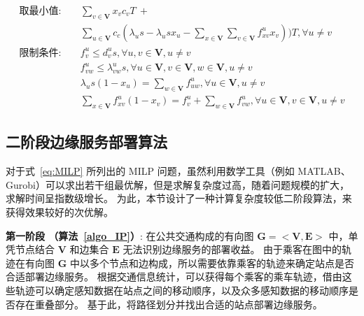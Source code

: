 \begin{equation}
\begin{aligned}
取最小值: &\quad \sum_{v\in \boldsymbol{V}}x_v c_vT \ + \\&\quad \sum_{u\in \boldsymbol{V}}c_c(\lambda_u s -  \lambda_u s x_u - \sum_{x\in \boldsymbol{V}}\sum_{v\in \boldsymbol{V}}f^u_{xv} x_v ))T, \forall u \neq v\\
\text{限制条件:} &\quad  f^u_v \leq d^u_v s, \forall u, v\in \boldsymbol{V}, u\neq v\\
&\quad f^u_{vw} \leq \lambda^u_{vw} s, \forall u \in \boldsymbol{V}, v \in \boldsymbol{V}, w \in \boldsymbol{V}, u \neq v\\
&\quad \lambda_u s (1 - x_u) = \sum_{w\in \boldsymbol{V}}f^u_{uw}, \forall u\in \boldsymbol{V}, u \neq v\\
&\quad \sum_{x\in \boldsymbol{V}}f^u_{xv} (1-x_v) = f^u_v + \sum_{w\in \boldsymbol{V}}f^u_{vw}, \forall u\in \boldsymbol{V}, v\in \boldsymbol{V},u \neq v
\end{aligned}
\label{eq:MILP}
\end{equation}

\subsection{二阶段边缘服务部署算法}

对于式~\eqref{eq:MILP} 所列出的 MILP 问题，虽然利用数学工具（例如 MATLAB、Gurobi）可以求出若干组最优解，但是求解复杂度过高，随着问题规模的扩大，求解时间呈指数级增长。
为此，本节设计了一种计算复杂度较低二阶段算法，来获得效果较好的次优解。

\textbf{第一阶段 （算法~\ref{algo_IP}）}:
在公共交通构成的有向图 $\boldsymbol{G}=<\boldsymbol{V}, \boldsymbol{E}>$ 中，单凭节点结合 $\boldsymbol{V}$ 和边集合 $\boldsymbol{E}$ 无法识别边缘服务的部署收益。
由于乘客在图中的轨迹在有向图 $\boldsymbol{G}$ 中以多个节点和边构成，所以需要依靠乘客的轨迹来确定站点是否合适部署边缘服务。
根据交通信息统计，可以获得每个乘客的乘车轨迹，借由这些轨迹可以确定感知数据在站点之间的移动顺序，以及众多感知数据的移动顺序是否存在重叠部分。
基于此，将路径划分并找出合适的站点部署边缘服务。

